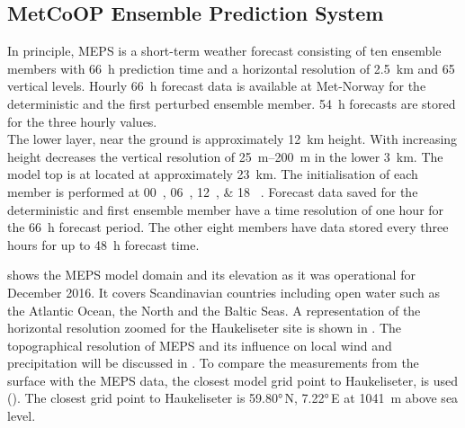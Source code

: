 \subsection{MetCoOP Ensemble Prediction System}\label{sec:AROME}
In principle, MEPS is a short-term weather forecast consisting of ten ensemble members %
with \SI{66}{\hour} prediction time and a horizontal resolution of \SI{2.5}{\km} and 65 vertical levels. Hourly \SI{66}{\hour} forecast data is available at Met-Norway for the deterministic and the first perturbed ensemble member. \SI{54}{\hour} forecasts are stored for the three hourly values.
\\
The lower layer, near the ground is approximately \SI{12}{\km} height. With increasing height decreases the vertical resolution of \SIrange{25}{200}{\metre} in the lower \SI{3}{\km}. The model top is at located at approximately \SI{23}{\km}.
The initialisation of each member is performed at \SIlist{00;06;12;18}{\UTC} \citep{metcoop_wiki_description_2017}.
Forecast data saved for the deterministic and first ensemble member have a time resolution of one hour for the \SI{66}{\hour} forecast period. The other eight members have data stored every three hours for up to \SI{48}{\hour} forecast time.

\noindent
{} shows 
the MEPS model domain and its elevation as it was operational for December 2016. It covers Scandinavian countries including open water such as the Atlantic Ocean, the North and the Baltic Seas. 
A representation of the horizontal resolution zoomed for the Haukeliseter site is shown in . 
The topographical resolution of MEPS and its influence on local wind and precipitation will be discussed in .
To compare the measurements from the surface with the MEPS data, the closest model grid point to Haukeliseter, is used (). The closest grid point to Haukeliseter is \ang{59.80}\,N, \ang{7.22}\,E at \SI{1041}{\metre} above sea level.
\\
